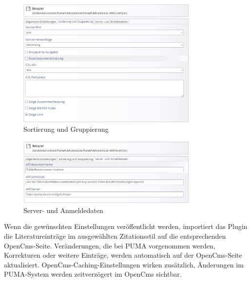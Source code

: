\begin{figure}[h!]
 \centering
 \includegraphics[width=9cm]{Bilder/Kapitel9/Mitarbeiterliste2}
 \caption{Sortierung und Gruppierung}
 \label{fig:mplSortierungGruppierung}
\end{figure}
\begin{figure}[h!]
 \centering
 \includegraphics[width=9cm]{Bilder/Kapitel9/Mitarbeiterliste3}
 \caption{Server- und Anmeldedaten}
 \label{fig:mplServerAnmeldedaten}
\end{figure}
Wenn die gewünschten Einstellungen veröffentlicht werden, importiert das Plugin die Literatureinträge im ausgewählten Zitationsstil auf die entsprechenden OpenCms-Seite. Veränderungen, die bei PUMA vorgenommen werden, Korrekturen oder weitere Einträge, werden automatisch auf der OpenCms-Seite aktualisiert. OpenCms-Caching-Einstellungen wirken zusätzlich, Änderungen im PUMA-System werden zeitverzögert im OpenCms sichtbar.
